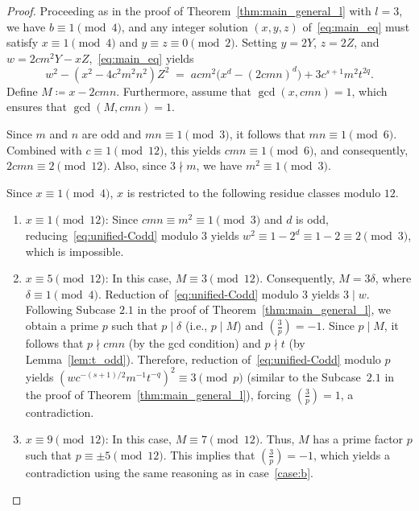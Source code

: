 \documentclass[11pt,a4paper]{amsart}
\theoremstyle{plain}
\theoremstyle{definition}
\begin{document}
\begin{proof}
Proceeding as in the proof of Theorem~\ref{thm:main_general_l} with $l=3$, we have $b\equiv1\pmod{4}$, and any integer solution $(x,y,z)$ of~\eqref{eq:main_eq} must satisfy $x\equiv1\pmod{4}$ and $y \equiv z\equiv 0\pmod{2}$. Setting $y=2Y$, $z=2Z$, and $w = 2cm^{2}Y - x Z$,~\eqref{eq:main_eq} yields
\begin{equation}\label{eq:unified-Codd}
  w^2 - (x^2 - 4c^2m^2n^2)Z^2 \;=\; acm^2\bigl(x^d - (2cmn)^d\bigr) + 3 c^{s+1}m^2t^{2q}.
\end{equation}
Define $M \coloneqq x - 2cmn$. Furthermore, assume that $\gcd(x, cmn) = 1$, which ensures that $\gcd(M, cmn) =1$. 


Since $m$ and $n$ are odd and $mn \equiv 1 \pmod 3$, it follows that $mn \equiv 1 \pmod 6$. Combined with $c \equiv 1 \pmod{12}$, this yields $cmn \equiv 1 \pmod 6$, and consequently, $2cmn \equiv 2 \pmod{12}$. Also, since $3\nmid m$, we have $m^2\equiv1\pmod{3}$.

Since $x \equiv 1 \pmod 4$, $x$ is restricted to the following residue classes modulo $12$. 

\begin{enumerate}[label=(\alph*)]
  \item \textit{$x \equiv 1 \pmod{12}$}: Since $cmn \equiv m^2\equiv1\pmod{3}$ and $d$ is odd, reducing~\eqref{eq:unified-Codd} modulo $3$ yields $w^2 \equiv 1-2^d\equiv 1-2\equiv 2 \pmod 3$, which is impossible.
  \item \textit{$x \equiv 5 \pmod{12}$}\label{case:b}: In this case, $M \equiv 3 \pmod{12}$. Consequently, $M=3\delta$, where $\delta\equiv1\pmod{4}$. Reduction of~\eqref{eq:unified-Codd} modulo $3$ yields $3\mid w$. Following Subcase $2.1$ in the proof of Theorem~\ref{thm:main_general_l}, we obtain a prime $p$ such that $p \mid \delta$ (i.e., $p \mid M$) and $\left(\frac{3}{p}\right) = -1$. Since $p \mid M$, it follows that $p \nmid cmn$ (by the gcd condition) and $p \nmid t$ (by Lemma~\ref{lem:t_odd}). Therefore, reduction of~\eqref{eq:unified-Codd} modulo $p$ yields $(w c^{-(s+1)/2} m^{-1} t^{-q})^2  \equiv 3 \pmod p$ (similar to the  Subcase~$2.1$ in the proof of Theorem~\ref{thm:main_general_l}), forcing $\left(\frac{3}{p}\right) = 1$, a contradiction.
  \item \textit{$x \equiv 9 \pmod{12}$}: In this case, $M \equiv 7 \pmod{12}$. Thus, $M$ has a prime factor $p$ such that $p \equiv \pm 5 \pmod{12}$. This implies that $\left(\frac{3}{p}\right) = -1$, which yields a contradiction using the same reasoning as in case~\ref{case:b}.
\end{enumerate}
\end{proof}
\end{document}
